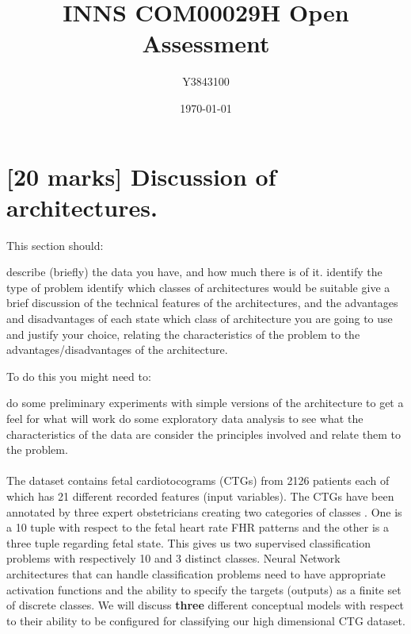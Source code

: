 \documentclass[11pt,a4paper]{article}
\title{INNS COM00029H Open Assessment}
\author{Y3843100}
\date{\today}
\begin{document}


\maketitle


\section{[20 marks] Discussion of architectures.}
\label{sec:discussion}
This section should:
\begin{outline}
  \1 describe (briefly) the data you have, and how much there is of it.
  \1 identify the type of problem
  \1 identify which classes of architectures would be suitable
  \1 give a brief discussion of the technical features of the architectures, and the advantages and disadvantages of each
  \1 state which class of architecture you are going to use and justify your choice, relating the characteristics of the problem to the advantages/disadvantages of the architecture.
\end{outline}

To do this you might need to:
\begin{outline}
  \1 do some preliminary experiments with simple versions of the architecture to get a feel for what will work
  \1 do some exploratory data analysis to see what the characteristics of the data are
  \1 consider the principles involved and relate them to the problem.
\end{outline}

\paragraph{}
The dataset contains fetal cardiotocograms (CTGs) from 2126 patients each of which has 21 different recorded features (input variables). The CTGs have been annotated by three expert obstetricians creating two categories of classes \autocite{Campos:2000}. One is a 10 tuple with respect to the fetal heart rate FHR patterns and the other is a three tuple regarding fetal state. This gives us two supervised classification problems with respectively 10 and 3 distinct classes. Neural Network architectures that can handle classification problems need to have appropriate activation functions and the ability to specify the targets (outputs) as a finite set of discrete classes. We will discuss \textbf{three} different conceptual models with respect to their ability to be configured for classifying our high dimensional CTG dataset.
\end{document}
